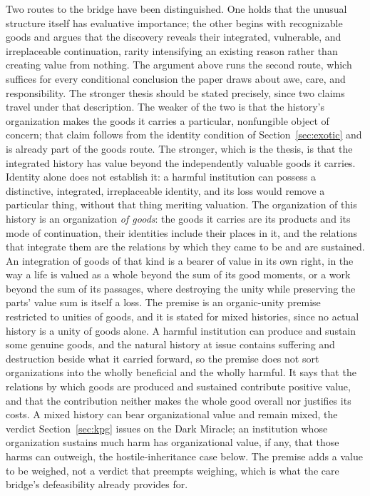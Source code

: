 Two routes to the bridge have been distinguished. One holds that the unusual
structure itself has evaluative
importance; the other begins with recognizable goods and argues that the
discovery reveals their integrated, vulnerable, and irreplaceable
continuation, rarity intensifying an existing reason rather than creating
value from nothing. The argument above runs the second route, which suffices
for every conditional conclusion the paper draws about awe, care, and
responsibility. The stronger thesis should be stated precisely, since two
claims travel under that description. The weaker of the
two is that the history's organization makes the goods it carries a
particular, nonfungible object of concern; that claim follows from the
identity condition of Section~\ref{sec:exotic} and is already part of the
goods route. The stronger, which is the thesis, is that the integrated
history has value beyond the independently valuable goods it carries. Identity
alone does not establish it: a harmful institution can possess a distinctive,
integrated, irreplaceable identity, and its loss would remove a particular
thing, without that thing meriting valuation. The organization of this
history is an organization
\emph{of goods}: the goods it carries are its products and its mode of
continuation, their identities include their places in it, and the relations
that integrate them are the relations by which they came to be and are
sustained. An integration of goods of that kind is a bearer of value in its
own right, in the way a life is valued as a whole beyond the sum of its good
moments, or a work beyond the sum of its passages, where destroying the unity
while preserving the parts' value sum is itself a loss. The premise is an
organic-unity premise restricted to unities of goods, and it is stated for
mixed histories, since no actual history is a unity of goods alone. A harmful
institution can produce and sustain some genuine goods, and the natural
history at issue contains suffering and destruction beside what it carried
forward, so the premise does not sort organizations into the wholly
beneficial and the wholly harmful. It says that the relations by which goods
are produced and sustained contribute positive value, and that the
contribution neither makes the whole good overall nor justifies its costs. A
mixed history can bear organizational value and remain mixed, the verdict
Section~\ref{sec:kpg} issues on the Dark Miracle;
 an institution whose organization sustains
much harm has organizational value, if any, that those harms can outweigh,
the hostile-inheritance case below. The premise adds a
value to be weighed, not a verdict that preempts weighing, which is what the
care bridge's defeasibility already provides for.


